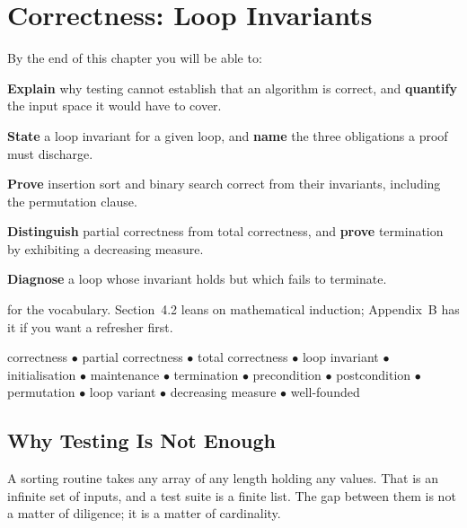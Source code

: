 \chapter{Correctness: Loop Invariants}\label{ch:invariants}

\begin{outcomes}
By the end of this chapter you will be able to:
\begin{tight}
  \item \textbf{Explain} why testing cannot establish that an algorithm is
        correct, and \textbf{quantify} the input space it would have to cover.
  \item \textbf{State} a loop invariant for a given loop, and \textbf{name} the
        three obligations a proof must discharge.
  \item \textbf{Prove} insertion sort and binary search correct from their
        invariants, including the permutation clause.
  \item \textbf{Distinguish} partial correctness from total correctness, and
        \textbf{prove} termination by exhibiting a decreasing measure.
  \item \textbf{Diagnose} a loop whose invariant holds but which fails to
        terminate.
\end{tight}
\end{outcomes}

\begin{prereq}
 for the vocabulary. Section~4.2 leans on mathematical induction;
Appendix~B has it if you want a refresher first.
\end{prereq}

\begin{keyterms}
correctness $\bullet$ partial correctness $\bullet$ total correctness $\bullet$
loop invariant $\bullet$ initialisation $\bullet$ maintenance $\bullet$
termination $\bullet$ precondition $\bullet$ postcondition $\bullet$
permutation $\bullet$ loop variant $\bullet$ decreasing measure $\bullet$
well-founded
\end{keyterms}

\section{Why Testing Is Not Enough}

A sorting routine takes any array of any length holding any values. That is an
infinite set of inputs, and a test suite is a finite list. The gap between them
is not a matter of diligence; it is a matter of cardinality.

